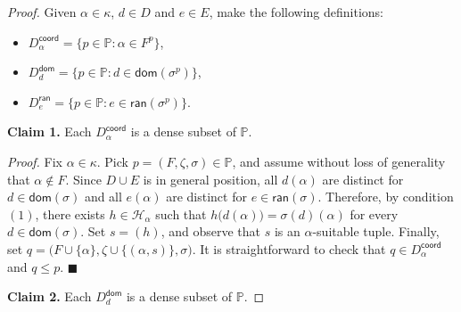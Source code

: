 \documentclass{amsart}
\theoremstyle{plain}
\theoremstyle{definition}
\newcommand{\dom}{\mathsf{dom}}
\newcommand{\ran}{\mathsf{ran}}
\newcommand{\coord}{\mathsf{coord}}
\newcommand{\HH}{\mathcal{H}}
\newcommand{\PPP}{\mathbb{P}}
\begin{document}
\begin{proof}
Given $\alpha\in\kappa$, $d\in D$ and $e\in E$, make the following definitions:
\begin{itemize}
\item $D^\coord_\alpha=\{p\in\PPP:\alpha\in F^p\}$,
\item $D^\dom_d=\{p\in\PPP:d\in\dom(\sigma^p)\}$,
\item $D^\ran_e=\{p\in\PPP:e\in\ran(\sigma^p)\}$.
\end{itemize}

\noindent\textbf{Claim 1.} Each $D^\coord_\alpha$ is a dense subset of $\PPP$.

\noindent\textit{Proof.} Fix $\alpha\in\kappa$. Pick $p=(F,\zeta,\sigma)\in\PPP$, and assume without loss of generality that $\alpha\notin F$. Since $D\cup E$ is in general position, all $d(\alpha)$ are distinct for $d\in\dom(\sigma)$ and all $e(\alpha)$ are distinct for $e\in\ran(\sigma)$. Therefore, by condition $(1)$, there exists $h\in\HH_\alpha$ such that $h\big(d(\alpha)\big)=\sigma(d)(\alpha)$ for every $d\in\dom(\sigma)$. Set $s=(h)$, and observe that $s$ is an $\alpha$-suitable tuple. Finally, set $q=\big(F\cup\{\alpha\},\zeta\cup\{(\alpha,s)\},\sigma\big)$. It is straightforward to check that $q\in D^\coord_\alpha$ and $q\leq p$. $\blacksquare$

\noindent\textbf{Claim 2.} Each $D^\dom_d$ is a dense subset of $\PPP$.


\end{proof}
\end{document}
